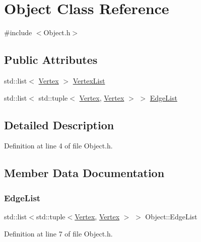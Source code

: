 \hypertarget{class_object}{}\section{Object Class Reference}
\label{class_object}


{\ttfamily \#include $<$Object.\+h$>$}

\subsection*{Public Attributes}
\begin{DoxyCompactItemize}
\item 
std\+::list$<$ \mbox{\hyperlink{class_vertex}{Vertex}} $>$ \mbox{\hyperlink{class_object_a297ee1fc6cb276fc66368c5810bfac31}{Vertex\+List}}
\item 
std\+::list$<$ std\+::tuple$<$ \mbox{\hyperlink{class_vertex}{Vertex}}, \mbox{\hyperlink{class_vertex}{Vertex}} $>$ $>$ \mbox{\hyperlink{class_object_aaeef5dc5580e7c7559e023aa5b39d714}{Edge\+List}}
\end{DoxyCompactItemize}


\subsection{Detailed Description}


Definition at line 4 of file Object.\+h.



\subsection{Member Data Documentation}
\mbox{\label{class_object_aaeef5dc5580e7c7559e023aa5b39d714}} 
\subsubsection{\texorpdfstring{Edge\+List}{EdgeList}}
{\footnotesize\ttfamily std\+::list$<$std\+::tuple$<$\mbox{\hyperlink{class_vertex}{Vertex}}, \mbox{\hyperlink{class_vertex}{Vertex}} $>$ $>$ Object\+::\+Edge\+List}



Definition at line 7 of file Object.\+h.

\mbox{\label{class_object_a297ee1fc6cb276fc66368c5810bfac31}} 
